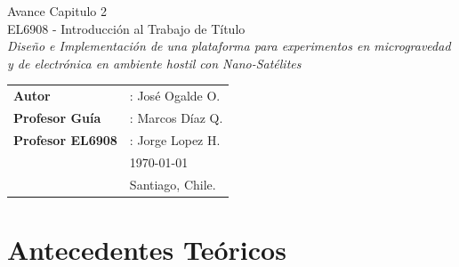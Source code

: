 \documentclass[11pt,letterpaper]{article}
\begin{document}
\newpage
\pagestyle{fancy}
\fancyhf{}
\vspace*{6cm}
\begin{center}
\Huge  {Avance Capitulo 2} \\
\vspace{1cm}
\LARGE {EL6908 - Introducción al Trabajo de Título}\\
\vspace{0.5cm}
\LARGE {\textit{Diseño e Implementación de una plataforma para experimentos en microgravedad y de electrónica en ambiente hostil con Nano-Sat\'elites}}\\
\end{center}
\vfill
\begin{flushright}
\begin{tabular}{ll}
\textbf{Autor} &: Jos\'e Ogalde O.\\
\textbf{Profesor Guía} &: Marcos Díaz Q.\\
\textbf{Profesor EL6908} &: Jorge Lopez H.\\
& \today\\
& Santiago, Chile.
\end{tabular}
\end{flushright}

\newpage
\pagestyle{fancy}
\fancyhf{}
\fancyhead[R]{\small \rm \textbf{\thepage}}
\renewcommand{\sectionmark}[1]{\markright{\thesection.\ #1}}
\renewcommand{\headrulewidth}{0.5pt}
\renewcommand{\footrulewidth}{0.5pt}


\tableofcontents
\listoffigures
\listoftables

\newpage

\section{Antecedentes Teóricos}
\end{document}
